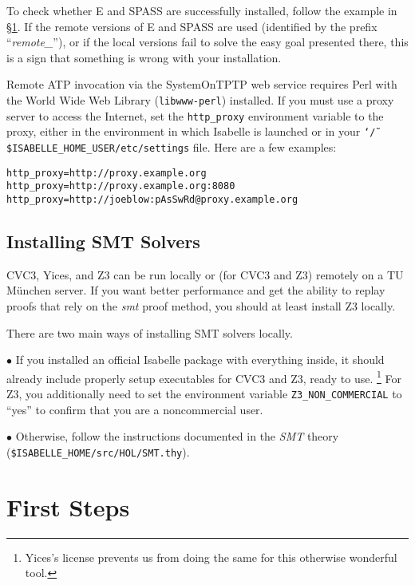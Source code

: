 \documentclass[a4paper,12pt]{article}
\begin{document}
To check whether E and SPASS are successfully installed, follow the example in
\S\ref{first-steps}. If the remote versions of E and SPASS are used (identified
by the prefix ``\emph{remote\_}''), or if the local versions fail to solve the
easy goal presented there, this is a sign that something is wrong with your
installation.

Remote ATP invocation via the SystemOnTPTP web service requires Perl with the
World Wide Web Library (\texttt{libwww-perl}) installed. If you must use a proxy
server to access the Internet, set the \texttt{http\_proxy} environment variable
to the proxy, either in the environment in which Isabelle is launched or in your
\texttt{\char`\~/\$ISABELLE\_HOME\_USER/etc/settings} file. Here are a few examples:

\prew
\texttt{http\_proxy=http://proxy.example.org} \\
\texttt{http\_proxy=http://proxy.example.org:8080} \\
\texttt{http\_proxy=http://joeblow:pAsSwRd@proxy.example.org}
\postw

\subsection{Installing SMT Solvers}

CVC3, Yices, and Z3 can be run locally or (for CVC3 and Z3) remotely on a TU
M\"unchen server. If you want better performance and get the ability to replay
proofs that rely on the \emph{smt} proof method, you should at least install Z3
locally.

There are two main ways of installing SMT solvers locally.

\begin{enum}
\item[$\bullet$] If you installed an official Isabelle package with everything
inside, it should already include properly setup executables for CVC3 and Z3,
ready to use.%
\footnote{Yices's license prevents us from doing the same for this otherwise
wonderful tool.}
For Z3, you additionally need to set the environment variable
\texttt{Z3\_NON\_COMMERCIAL} to ``yes'' to confirm that you are a noncommercial
user.

\item[$\bullet$] Otherwise, follow the instructions documented in the \emph{SMT}
theory (\texttt{\$ISABELLE\_HOME/src/HOL/SMT.thy}).
\end{enum}

\section{First Steps}
\label{first-steps}
\end{document}
